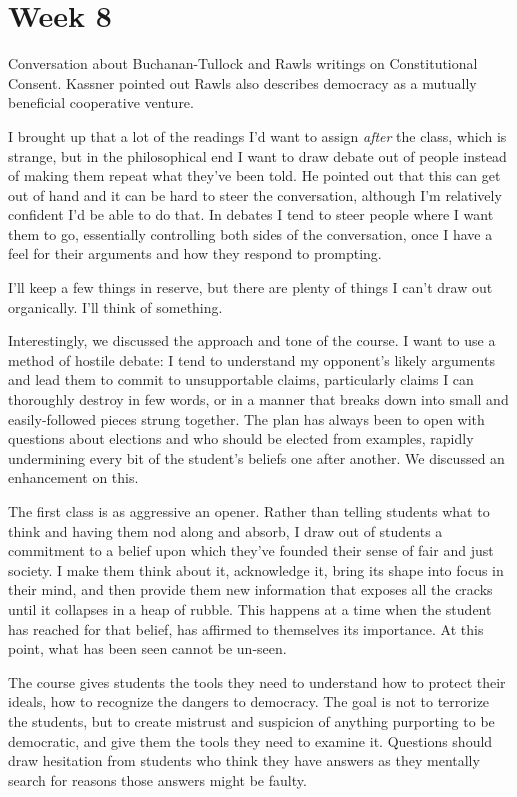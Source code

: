
\section{Week 8}

Conversation about Buchanan-Tullock and Rawls writings on Constitutional Consent.  Kassner pointed out Rawls also describes democracy as a mutually beneficial cooperative venture.

I brought up that a lot of the readings I'd want to assign \textit{after} the class, which is strange, but in the philosophical end I want to draw debate out of people instead of making them repeat what they've been told.  He pointed out that this can get out of hand and it can be hard to steer the conversation, although I'm relatively confident I'd be able to do that.  In debates I tend to steer people where I want them to go, essentially controlling both sides of the conversation, once I have a feel for their arguments and how they respond to prompting.

I'll keep a few things in reserve, but there are plenty of things I can't draw out organically.  I'll think of something.

Interestingly, we discussed the approach and tone of the course.  I want to use a method of hostile debate:  I tend to understand my opponent's likely arguments and lead them to commit to unsupportable claims, particularly claims I can thoroughly destroy in few words, or in a manner that breaks down into small and easily-followed pieces strung together.  The plan has always been to open with questions about elections and who should be elected from examples, rapidly undermining every bit of the student's beliefs one after another.  We discussed an enhancement on this.

The first class is as aggressive an opener.  Rather than telling students what to think and having them nod along and absorb, I draw out of students a commitment to a belief upon which they've founded their sense of fair and just society.  I make them think about it, acknowledge it, bring its shape into focus in their mind, and then provide them new information that exposes all the cracks until it collapses in a heap of rubble.  This happens at a time when the student has reached for that belief, has affirmed to themselves its importance.  At this point, what has been seen cannot be un-seen.

The course gives students the tools they need to understand how to protect their ideals, how to recognize the dangers to democracy.  The goal is not to terrorize the students, but to create mistrust and suspicion of anything purporting to be democratic, and give them the tools they need to examine it.  Questions should draw hesitation from students who think they have answers as they mentally search for reasons those answers might be faulty.

